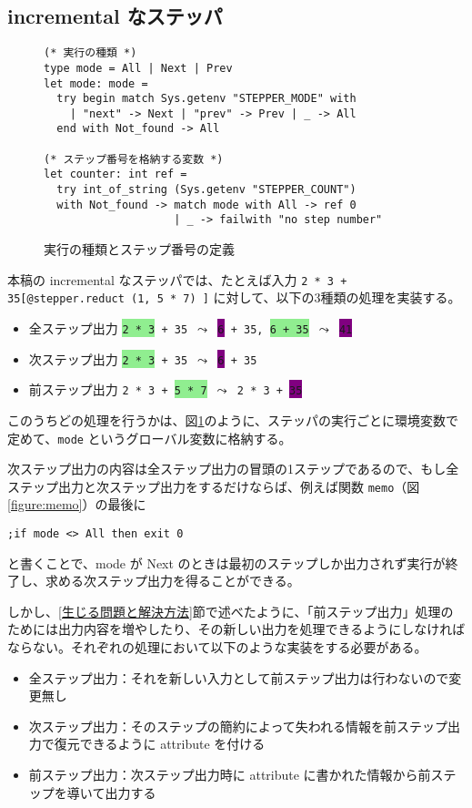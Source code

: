 \subsection{incremental なステッパ}

\begin{figure}[t]
\begin{verbatim}
(* 実行の種類 *)
type mode = All | Next | Prev
let mode: mode =
  try begin match Sys.getenv "STEPPER_MODE" with
    | "next" -> Next | "prev" -> Prev | _ -> All
  end with Not_found -> All

(* ステップ番号を格納する変数 *)
let counter: int ref =
  try int_of_string (Sys.getenv "STEPPER_COUNT")
  with Not_found -> match mode with All -> ref 0
                    | _ -> failwith "no step number"
\end{verbatim}
\caption{実行の種類とステップ番号の定義}
\label{figure:mode}
\end{figure}

本稿の incremental なステッパでは、たとえば入力 \texttt{2 * 3 + 35[@stepper.reduct (1, 5 * 7) ]} に対して、以下の3種類の処理を実装する。

\begin{itemize}
\item 全ステップ出力 \texttt{\colorbox{lightgreen}{2 * 3} + 35 $\leadsto$ \colorbox{purple}{6} + 35, \colorbox{lightgreen}{6 + 35} $\leadsto$ \colorbox{purple}{41}}
\item 次ステップ出力 \texttt{\colorbox{lightgreen}{2 * 3} + 35 $\leadsto$ \colorbox{purple}{6} + 35}
\item 前ステップ出力 \texttt{2 * 3 + \colorbox{lightgreen}{5 * 7} $\leadsto$ 2 * 3 + \colorbox{purple}{35}}
\end{itemize}

このうちどの処理を行うかは、図\ref{figure:mode}のように、ステッパの実行ごとに環境変数で定めて、\texttt{mode} というグローバル変数に格納する。

次ステップ出力の内容は全ステップ出力の冒頭の1ステップであるので、もし全ステップ出力と次ステップ出力をするだけならば、例えば関数 \texttt{memo}（図\ref{figure:memo}）の最後に
\begin{verbatim}
;if mode <> All then exit 0
\end{verbatim}
と書くことで、mode が Next のときは最初のステップしか出力されず実行が終了し、求める次ステップ出力を得ることができる。

しかし、\ref{生じる問題と解決方法}節で述べたように、「前ステップ出力」処理のためには出力内容を増やしたり、その新しい出力を処理できるようにしなければならない。それぞれの処理において以下のような実装をする必要がある。
\begin{itemize}
\item 全ステップ出力：それを新しい入力として前ステップ出力は行わないので変更無し
\item 次ステップ出力：そのステップの簡約によって失われる情報を前ステップ出力で復元できるように attribute を付ける
\item 前ステップ出力：次ステップ出力時に attribute に書かれた情報から前ステップを導いて出力する
\end{itemize}

